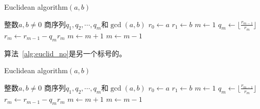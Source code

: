 \begin{algorithm}
	\caption{Euclidean algorithm$(a,b)$}
	\label{alg:euclid}
	\begin{algorithmic}[1]
		\REQUIRE 整数$a,b\ne 0$
		\ENSURE  商序列$q_1,q_2,\cdots,q_m$和$\gcd(a,b)$
		\STATE $r_0 \leftarrow a$
		\STATE $r_1 \leftarrow b$
		\STATE $m\leftarrow 1$
		\STATE $q_m\leftarrow\lfloor\frac{r_{m-1}}{r_m}\rfloor$
		\STATE $r_m\leftarrow r_{m-1}-q_mr_m$
		\STATE $m\leftarrow m+1$
		\ENDWHILE
		\STATE $m\leftarrow m-1$
	\end{algorithmic}
\end{algorithm}
算法~\ref{alg:euclid_no}是另一个标号的。
\begin{algorithm}
	\caption{Euclidean algorithm$(a,b)$}
	\label{alg:euclid_no}
	\begin{algorithmic}[2]
		\REQUIRE 整数$a,b\ne 0$
		\ENSURE  商序列$q_1,q_2,\cdots,q_m$和$\gcd(a,b)$
		\STATE $r_0 \leftarrow a$
		\STATE $r_1 \leftarrow b$
		\STATE $m\leftarrow 1$
		\STATE $q_m\leftarrow\lfloor\frac{r_{m-1}}{r_m}\rfloor$
		\STATE $r_m\leftarrow r_{m-1}-q_mr_m$
		\STATE $m\leftarrow m+1$
		\ENDWHILE
		\STATE $m\leftarrow m-1$
	\end{algorithmic}
\end{algorithm}

